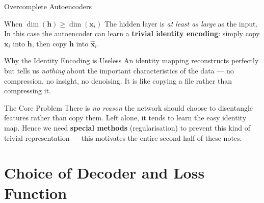 \documentclass{beamer}
\begin{document}
\begin{frame}[shrink=10]{Overcomplete Autoencoders}
  \begin{block}{When $\dim(\mathbf{h}) \geq \dim(\mathbf{x}_i)$}
    The hidden layer is \emph{at least as large} as the input.
    In this case the autoencoder can learn a \textbf{trivial identity
    encoding}: simply copy $\mathbf{x}_i$ into $\mathbf{h}$, then copy
    $\mathbf{h}$ into $\hat{\mathbf{x}}_i$.
  \end{block}

  \begin{alertblock}{Why the Identity Encoding is Useless}
    An identity mapping reconstructs perfectly but tells us
    \emph{nothing} about the important characteristics of the data ---
    no compression, no insight, no denoising. It is like copying a
    file rather than compressing it.
  \end{alertblock}

  \begin{block}{The Core Problem}
    There is \emph{no reason} the network should choose to disentangle
    features rather than copy them. Left alone, it tends to learn the
    easy identity map. Hence we need \textbf{special methods}
    (regularisation) to prevent this kind of trivial representation ---
    this motivates the entire second half of these notes.
  \end{block}
\end{frame}

\section{Choice of Decoder and Loss Function}
\end{document}
